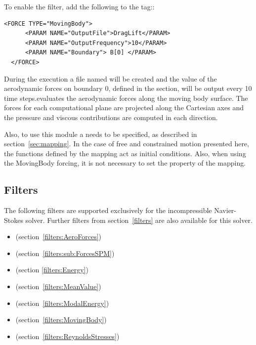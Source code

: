 To enable the filter, add the following to the  tag::

\begin{lstlisting}[style=XMLStyle]
  <FORCE TYPE="MovingBody">
      <PARAM NAME="OutputFile">DragLift</PARAM>
      <PARAM NAME="OutputFrequency">10</PARAM>
      <PARAM NAME="Boundary"> B[0] </PARAM>
  </FORCE>
\end{lstlisting}

During the execution a file named  will be created and the
value of the aerodynamic forces on boundary 0, defined in the
 section, will be output every 10 time steps.evaluates the aerodynamic forces along the moving body surface. The
forces for each computational plane are projected along the Cartesian axes and the pressure and viscous contributions are computed in each direction.

Also, to use this module a  needs to be specified, as described in section~\ref{sec:mapping}. In the case of free and constrained motion presented here, the functions defined by the mapping act as initial conditions. Also, when using the MovingBody forcing, it is not necessary to set the  property of the mapping. 

\subsection{Filters}
The following filters are supported exclusively for the incompressible
Navier-Stokes solver. Further filters from section~\ref{filters} are also
available for this solver.

\begin{itemize}
  \item {} (section~\ref{filters:AeroForces})
  \item {} (section~\ref{filters:sub:ForcesSPM})
  \item {} (section \ref{filters:Energy})
  \item {} (section~\ref{filters:MeanValue})
  \item {} (section~\ref{filters:ModalEnergy})
  \item {} (section~\ref{filters:MovingBody})
  \item {} (section~\ref{filters:ReynoldsStresses})
\end{itemize}


